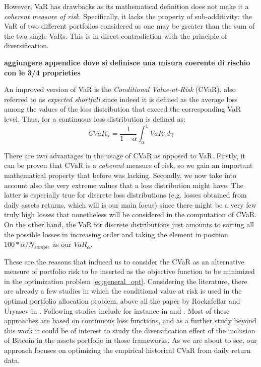 However, VaR has drawbacks as its mathematical definition does not make it a \textit{coherent measure of risk}. Specifically, it lacks the property of sub-additivity: the VaR of two different portfolios  considered as one may be greater than the sum of the two single VaRs. This is in direct contradiction with the principle of diversification.

\textbf{aggiungere appendice dove si definisce una misura coerente di rischio con le 3/4 proprieties}

An improved version of VaR is the \textit{Conditional Value-at-Risk} (CVaR), also referred to as \textit{expected shortfall} since indeed it is defined as the average loss among the values of the loss distribution that exceed the corresponding VaR level. Thus, for a continuous loss distribution is defined as:
\begin{equation}
	CVaR_\alpha = \frac{1}{1-\alpha} \int_{\alpha}^{1} VaR_\gamma d\gamma 
\end{equation}

There are two advantages in the usage of CVaR as opposed to VaR. Firstly, it can be proven that CVaR is a \textit{coherent} measure of risk, so we gain an important mathematical property that before was lacking. Secondly, we now take into account also the very extreme values that a loss distribution might have. The latter is especially true for discrete loss distributions (e.g. losses obtained from daily assets returns, which will is our main focus) since there might be a very few  truly high losses that nonetheless will be considered in the computation of CVaR. On the other hand, the VaR for discrete distributions just amounts to sorting all the possible losses in increasing order and taking the element in position $100*\alpha / N_{sample}$ as our $VaR_\alpha$. 

These are the reasons that induced us to consider the CVaR as an alternative measure of portfolio risk to be inserted as the objective function to be minimized in the optimization problem \eqref{eq:general_opt}. 
Considering the literature, there are already a few studies in which the conditional value at risk is used in the optimal portfolio allocation problem,  above all the paper by Rockafellar and Uryasev in \cite{ROCKAFELLAR2000}. Following studies include for instance in \cite{DICLEMENTE2002} and \cite{QUARANTA2008}. 
Most of these approaches are based on continuous loss functions, and as a further study beyond this work it could be of interest to study the diversification effect of the inclusion of Bitcoin in the assets portfolio in those frameworks. As we are about to see, our approach  focuses on optimizing the empirical historical CVaR from daily return data.




